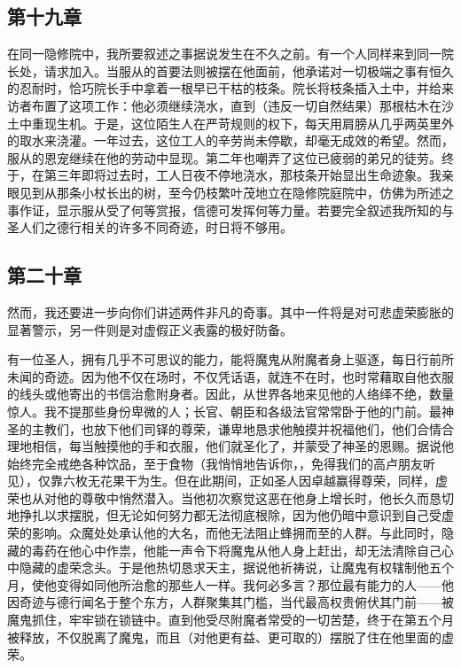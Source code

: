 
\subsection{第十九章}

在同一隐修院中，我所要叙述之事据说发生在不久之前。有一个人同样来到同一院长处，请求加入。当服从的首要法则被摆在他面前，他承诺对一切极端之事有恒久的忍耐时，恰巧院长手中拿着一根早已干枯的枝条。院长将枝条插入土中，并给来访者布置了这项工作：他必须继续浇水，直到（违反一切自然结果）那根枯木在沙土中重现生机。于是，这位陌生人在严苛规则的权下，每天用肩膀从几乎两英里外的取水来浇灌。一年过去，这位工人的辛劳尚未停歇，却毫无成效的希望。然而，服从的恩宠继续在他的劳动中显现。第二年也嘲弄了这位已疲弱的弟兄的徒劳。终于，在第三年即将过去时，工人日夜不停地浇水，那枝条开始显出生命迹象。我亲眼见到从那条小杖长出的树，至今仍枝繁叶茂地立在隐修院庭院中，仿佛为所述之事作证，显示服从受了何等赏报，信德可发挥何等力量。若要完全叙述我所知的与圣人们之德行相关的许多不同奇迹，时日将不够用。\par


\subsection{第二十章}

然而，我还要进一步向你们讲述两件非凡的奇事。其中一件将是对可悲虚荣膨胀的显著警示，另一件则是对虚假正义表露的极好防备。\par

有一位圣人，拥有几乎不可思议的能力，能将魔鬼从附魔者身上驱逐，每日行前所未闻的奇迹。因为他不仅在场时，不仅凭话语，就连不在时，也时常藉取自他衣服的线头或他寄出的书信治愈附身者。因此，从世界各地来见他的人络绎不绝，数量惊人。我不提那些身份卑微的人；长官、朝臣和各级法官常常卧于他的门前。最神圣的主教们，也放下他们司铎的尊荣，谦卑地恳求他触摸并祝福他们，他们合情合理地相信，每当触摸他的手和衣服，他们就圣化了，并蒙受了神圣的恩赐。据说他始终完全戒绝各种饮品，至于食物（我悄悄地告诉你，，免得我们的高卢朋友听见），仅靠六枚无花果干为生。但在此期间，正如圣人因卓越赢得尊荣，同样，虚荣也从对他的尊敬中悄然潜入。当他初次察觉这恶在他身上增长时，他长久而恳切地挣扎以求摆脱，但无论如何努力都无法彻底根除，因为他仍暗中意识到自己受虚荣的影响。众魔处处承认他的大名，而他无法阻止蜂拥而至的人群。与此同时，隐藏的毒药在他心中作祟，他能一声令下将魔鬼从他人身上赶出，却无法清除自己心中隐藏的虚荣念头。于是他热切恳求天主，据说他祈祷说，让魔鬼有权辖制他五个月，使他变得如同他所治愈的那些人一样。我何必多言？那位最有能力的人——他因奇迹与德行闻名于整个东方，人群聚集其门槛，当代最高权贵俯伏其门前——被魔鬼抓住，牢牢锁在锁链中。直到他受尽附魔者常受的一切苦楚，终于在第五个月被释放，不仅脱离了魔鬼，而且（对他更有益、更可取的）摆脱了住在他里面的虚荣。\par

